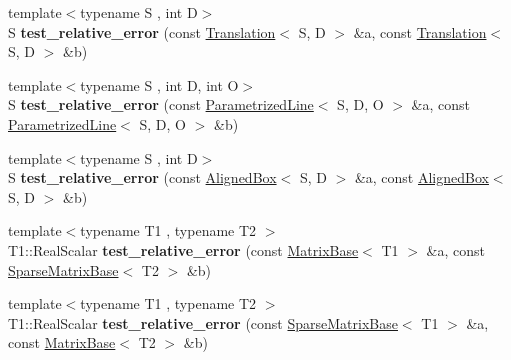 \begin{DoxyCompactItemize}
{\footnotesize template$<$typename S , int D$>$ }\\S {\bfseries test\+\_\+relative\+\_\+error} (const \hyperlink{group___geometry___module_class_eigen_1_1_translation}{Translation}$<$ S, D $>$ \&a, const \hyperlink{group___geometry___module_class_eigen_1_1_translation}{Translation}$<$ S, D $>$ \&b)
\item 
\mbox{\label{namespace_eigen_a0e5fc6174700be721bb9c27ce3f8815e}} 
{\footnotesize template$<$typename S , int D, int O$>$ }\\S {\bfseries test\+\_\+relative\+\_\+error} (const \hyperlink{group___geometry___module_class_eigen_1_1_parametrized_line}{Parametrized\+Line}$<$ S, D, O $>$ \&a, const \hyperlink{group___geometry___module_class_eigen_1_1_parametrized_line}{Parametrized\+Line}$<$ S, D, O $>$ \&b)
\item 
\mbox{\label{namespace_eigen_a6722d6113e8f684b5f69b222510b1173}} 
{\footnotesize template$<$typename S , int D$>$ }\\S {\bfseries test\+\_\+relative\+\_\+error} (const \hyperlink{group___geometry___module_class_eigen_1_1_aligned_box}{Aligned\+Box}$<$ S, D $>$ \&a, const \hyperlink{group___geometry___module_class_eigen_1_1_aligned_box}{Aligned\+Box}$<$ S, D $>$ \&b)
\item 
\mbox{\label{namespace_eigen_aa667ebc4e9a54db43dabaa8235a2c3b9}} 
{\footnotesize template$<$typename T1 , typename T2 $>$ }\\T1\+::\+Real\+Scalar {\bfseries test\+\_\+relative\+\_\+error} (const \hyperlink{group___core___module_class_eigen_1_1_matrix_base}{Matrix\+Base}$<$ T1 $>$ \&a, const \hyperlink{group___sparse_core___module_class_eigen_1_1_sparse_matrix_base}{Sparse\+Matrix\+Base}$<$ T2 $>$ \&b)
\item 
\mbox{\label{namespace_eigen_ae510fbb3f20a0114cb8428471ff902ed}} 
{\footnotesize template$<$typename T1 , typename T2 $>$ }\\T1\+::\+Real\+Scalar {\bfseries test\+\_\+relative\+\_\+error} (const \hyperlink{group___sparse_core___module_class_eigen_1_1_sparse_matrix_base}{Sparse\+Matrix\+Base}$<$ T1 $>$ \&a, const \hyperlink{group___core___module_class_eigen_1_1_matrix_base}{Matrix\+Base}$<$ T2 $>$ \&b)
\item 
\mbox{\label{namespace_eigen_ac7d9111c3a8c3efb7e8754d43543d67f}} 

\end{DoxyCompactItemize}
